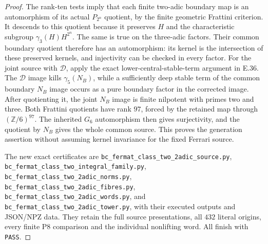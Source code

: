 \begin{proof}
The rank-ten tests imply that each finite
two-adic boundary map is an automorphism
of its actual $P_{2^n}$ quotient, by the
finite geometric Frattini criterion.
It descends to this quotient because it
preserves $H$ and the characteristic
subgroup $\gamma_3(H)H^{2^n}$.
The same is true on the three-adic factors.
Their common boundary quotient therefore
has an automorphism: its kernel is the
intersection of these preserved kernels,
and injectivity can be checked in every
factor.
For the joint source with $\mathscr D$,
apply the exact lower-central-stable-term
argument in E.36.  The $\mathscr D$ image
kills $\gamma_5(N_B)$, while a sufficiently
deep stable term of the common boundary
$N_B$ image occurs as a pure boundary
factor in the corrected image.
After quotienting it, the joint $N_B$
image is finite nilpotent with primes
two and three.  Both Frattini quotients
have rank $97$, forced by the retained
map through $(\mathbb Z/6)^{97}$.
The inherited $G_6$ automorphism then
gives surjectivity, and the quotient by
$N_B$ gives the whole common source.
This proves the generation assertion
without assuming kernel invariance for
the fixed Ferrari source.

The new exact certificates are
\texttt{bc\_fermat\_class\_two\_2adic\_source.py},
\texttt{bc\_fermat\_class\_two\_integral\_family.py},
\texttt{bc\_fermat\_class\_two\_2adic\_norms.py},
\texttt{bc\_fermat\_class\_two\_2adic\_fibres.py},
\texttt{bc\_fermat\_class\_two\_2adic\_words.py},
and \texttt{bc\_fermat\_class\_two\_2adic\_tower.py},
with their executed outputs and JSON/NPZ
data.  They retain the full source
presentations, all $432$ literal origins,
every finite P8 comparison and the
individual nonlifting word.  All finish
with \texttt{PASS}.
\end{proof}
